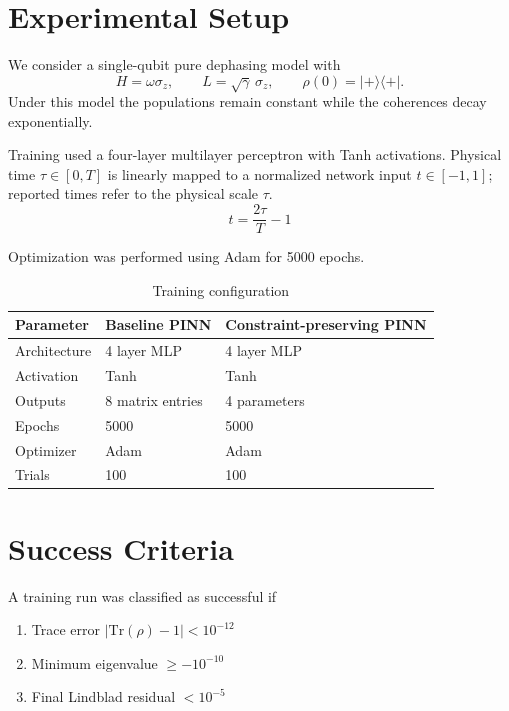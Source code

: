 \documentclass[11pt]{article}
\begin{document}
\section{Experimental Setup}

We consider a single-qubit pure dephasing model with
\[
H = \omega \sigma_z,
\qquad
L = \sqrt{\gamma}\,\sigma_z,
\qquad
\rho(0) = |+\rangle\langle+|.
\]
Under this model the populations remain constant while the coherences decay exponentially.

Training used a four-layer multilayer perceptron with Tanh activations.
Physical time $\tau \in [0,T]$ is linearly mapped to a normalized network input
$t \in [-1,1]$; reported times refer to the physical scale $\tau$.
\begin{equation}
t = \frac{2\tau}{T} - 1
\label{timemap}
\end{equation}

Optimization was performed using Adam for 5000 epochs.

\begin{table}[H]
\centering
\begin{tabular}{lll}
\toprule
Parameter & Baseline PINN & Constraint-preserving PINN \\
\midrule
Architecture & 4 layer MLP & 4 layer MLP \\
Activation & Tanh & Tanh \\
Outputs & 8 matrix entries & 4 parameters \\
Epochs & 5000 & 5000 \\
Optimizer & Adam & Adam \\
Trials & 100 & 100 \\
\bottomrule
\end{tabular}
\caption{Training configuration}
\label{tab:training}
\end{table}

\section{Success Criteria}

A training run was classified as successful if

\begin{enumerate}
\item Trace error $|\mathrm{Tr}(\rho)-1| < 10^{-12}$
\item Minimum eigenvalue $\ge -10^{-10}$
\item Final Lindblad residual $< 10^{-5}$
\end{enumerate}
\end{document}
